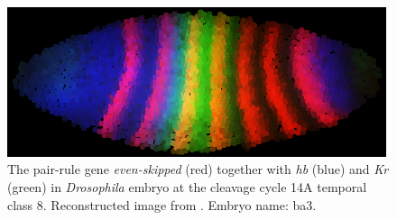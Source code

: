 \documentclass[12pt,a4paper,twoside,openright]{book}
\begin{document}
\begin{figure}
\centering
\includegraphics[width=0.99\textwidth]{img/drosophila}
\caption{The pair-rule gene  \emph{even-skipped} (red) together with \emph{hb} (blue) and \emph{Kr} (green) in \emph{Drosophila} embryo at the cleavage cycle 14A temporal class 8. Reconstructed image from \cite{flyex2009}. Embryo name: ba3. }
\label{fig:drosophila}       %
\end{figure}
\end{document}

